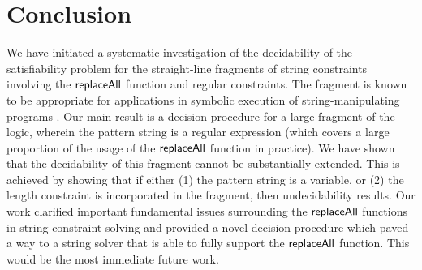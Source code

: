
\section{Conclusion}

We have initiated a systematic investigation of the decidability of 
the satisfiability problem for the straight-line fragments of string 
constraints involving the $\mathsf{replaceAll}$ function and regular constraints.
The fragment is known to be appropriate for applications in symbolic execution 
of 
string-manipulating programs \cite{LB16}. Our main result is a decision 
procedure for a large fragment of the logic, wherein the pattern string is
a regular expression (which covers a large proportion of the usage of the 
$\mathsf{replaceAll}$ function in practice). We have shown that the decidability
of this fragment cannot be substantially extended. This is achieved by showing
that if either (1) the pattern string is a variable, or (2) the length
constraint is incorporated in the fragment, then undecidability results.
Our work clarified important fundamental issues surrounding the $\mathsf{replaceAll}$
functions in string constraint solving and provided a novel decision procedure
which paved a way to a string solver that is able to fully support the
$\mathsf{replaceAll}$ function. This would be the most immediate future work. 
